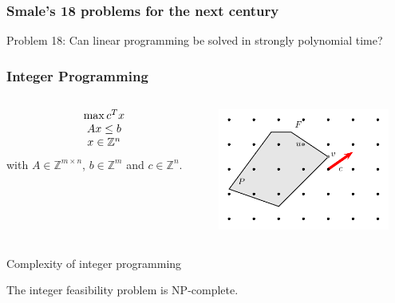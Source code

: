 \begin{frame}
  

\end{frame}


\begin{frame}
  \frametitle{Smale's 18 problems for the next century }
  Problem 18: Can linear programming be solved in strongly polynomial time? 
\end{frame}



\begin{frame}

  
\end{frame}

\begin{frame}
  \frametitle{Integer Programming}

  \begin{columns}
    \begin{column}{.3\textwidth}
\begin{displaymath}
  \begin{array}{c}
    \max c^Tx \\
    Ax\leq b \\
    x \in \mathbb{Z}^n 
  \end{array}
\end{displaymath}
with $A ∈ ℤ^{m ×n}$, $b ∈ ℤ^{m}$ and $c ∈ ℤ^n$. 
    \end{column}
    \begin{column}{.7\textwidth}
      
  \begin{center}
   \includegraphics[height=4cm]{../figures/IntProg1.pdf}
  \end{center}

    \end{column}       
  \end{columns}

\end{frame}



\begin{frame}{Complexity of integer programming} 

  \begin{theorem}
    The integer feasibility problem is NP-complete. 
  \end{theorem}
  
\end{frame}




